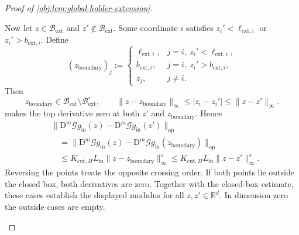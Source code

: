 \documentclass[11pt]{article}
\begin{document}
\begin{proof}[Proof of \cref{obj:lem:global-holder-extension}]
\begin{enumerate}
Now let \(z\in\mathcal B_{\mathrm{ext}}\) and \(z'\notin\mathcal B_{\mathrm{ext}}\). Some coordinate \(i\) satisfies
\(z_i'<\ell_{\mathrm{ext},i}\) or \(z_i'>b_{\mathrm{ext},i}\). Define
\[
(z_{\mathrm{boundary}})_j:=
\begin{cases}
\ell_{\mathrm{ext},i},&j=i,\ z_i'<\ell_{\mathrm{ext},i},\\
b_{\mathrm{ext},i},&j=i,\ z_i'>b_{\mathrm{ext},i},\\
z_j,&j\ne i.
\end{cases}
\]
Then
\[
z_{\mathrm{boundary}}\in
\mathcal B_{\mathrm{ext}}\setminus\mathcal B_{\mathrm{ext}}^\circ,
\qquad
\|z-z_{\mathrm{boundary}}\|_\infty
\le |z_i-z_i'|
\le\|z-z'\|_\infty.
\]
 makes the top derivative zero at both \(z'\) and
\(z_{\mathrm{boundary}}\). Hence
\[
\begin{aligned}
&\|\mathrm D^m\mathscr G g_{\mathrm{in}}(z)
-\mathrm D^m\mathscr G g_{\mathrm{in}}(z')\|_{\mathrm{op}}\\
&\quad=
\|\mathrm D^m\mathscr G g_{\mathrm{in}}(z)
-\mathrm D^m\mathscr G g_{\mathrm{in}}(z_{\mathrm{boundary}})\|_{\mathrm{op}}\\
&\quad\le
K_{\mathrm{cut},H}L_{\mathrm{in}}
\|z-z_{\mathrm{boundary}}\|_\infty^s
\le K_{\mathrm{cut},H}L_{\mathrm{in}}\|z-z'\|_\infty^s.
\end{aligned}
\]
Reversing the points treats the opposite crossing order. If both points lie outside the closed box, both derivatives are zero. Together with the closed-box estimate, these cases establish the displayed modulus for all \(z,z'\in\mathbb R^d\). In dimension zero the outside cases are empty.


\end{enumerate}
\end{proof}
\end{document}
